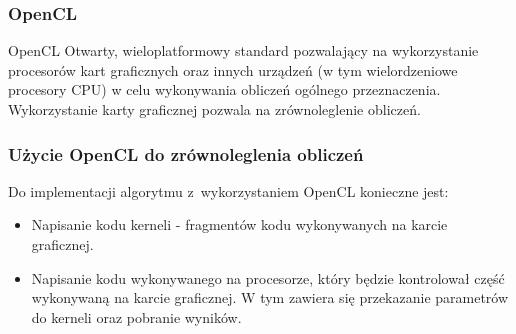 \begin{frame}
	\frametitle{OpenCL}
	\begin{block}{OpenCL}
		Otwarty, wieloplatformowy standard pozwalający na wykorzystanie procesorów kart graficznych oraz innych urządzeń (w tym wielordzeniowe procesory CPU) w celu wykonywania obliczeń ogólnego przeznaczenia. Wykorzystanie karty graficznej pozwala na zrównoleglenie obliczeń.
	\end{block}

\end{frame}


\begin{frame}
	\frametitle{Użycie OpenCL do zrównoleglenia obliczeń}

	Do implementacji algorytmu z~wykorzystaniem OpenCL konieczne jest:
	\begin{itemize}
		\item Napisanie kodu kerneli - fragmentów kodu wykonywanych na karcie graficznej.
		\item Napisanie kodu wykonywanego na procesorze, który będzie kontrolował część wykonywaną na karcie graficznej. W tym zawiera się przekazanie parametrów do kerneli oraz pobranie wyników.
	\end{itemize}

\end{frame}


